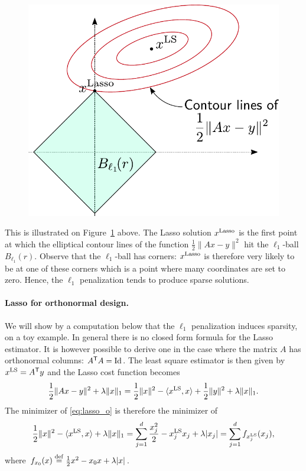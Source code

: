 \documentclass[11pt,nocut]{article}
\begin{document}
\begin{figure}[h!]
	\begin{center}
		\includegraphics[width=0.6\linewidth]{lasso.pdf}
	\end{center}
	\caption{}
	\label{fig:lasso}
\end{figure}
This is illustrated on Figure~\ref{fig:lasso} above. The Lasso solution $x^{\rm Lasso}$ is the first point at which the elliptical contour lines of the function $\frac{1}{2}\|Ax-y\|^2$ hit the $\ell_1$-ball $B_{\ell_1}(r)$. Observe that the $\ell_1$-ball has corners: $x^{\rm Lasso}$ is therefore very likely to be at one of these corners which is a point where many coordinates are set to zero. Hence, the $\ell_1$ penalization tends to produce sparse solutions.
\\

\paragraph{Lasso for orthonormal design.}
We will show by a computation below that the $\ell_1$ penalization induces sparsity, on a toy example.
In general there is no closed form formula for the Lasso estimator. It is however possible to derive one in the case where the matrix $A$ has orthonormal columns: $A^{{\sf T}} A = {{\rm Id}}$. 
The least square estimator is then given by $x^{\rm LS} = A^{{\sf T}} y$ and the Lasso cost function becomes
\begin{equation}\label{eq:lasso_o}
\frac{1}{2} \| Ax - y \|^2 + \lambda \|x\|_1 
= \frac{1}{2} \|x\|^2 - \langle x^{\rm LS}, x \rangle + \frac{1}{2} \|y\|^2 + \lambda \|x\|_1.
\end{equation}
The minimizer of \eqref{eq:lasso_o} is therefore the minimizer of
$$
\frac{1}{2} \|x\|^2 - \langle x^{\rm LS}, x \rangle + \lambda \|x\|_1
=
\sum_{j=1}^d \frac{x_j^2}{2} - x^{\rm LS}_j x_j + \lambda |x_j| 
=
\sum_{j=1}^d f_{x_j^{\rm LS}}(x_j),
$$
where $f_{x_0}(x) \overset{\rm def}{=} \frac{1}{2}x^2 - x_0 x + \lambda |x|$.
\end{document}

